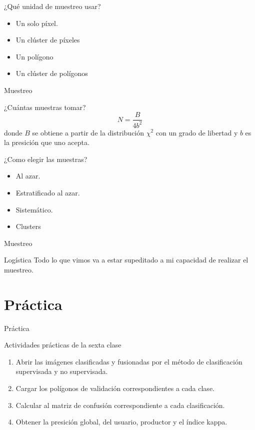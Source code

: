 \documentclass[]{beamer}
\begin{document}
\begin{frame}{\subsecname}
  \begin{block}{¿Qué unidad de muestreo usar?}
    \begin{itemize}[<+>]
      \item Un solo píxel.
      \item Un clúster de píxeles
      \item Un polígono
      \item Un clúster de polígonos
    \end{itemize}
  \end{block}
\end{frame}

\begin{frame}{Muestreo}
  \begin{block}{¿Cuántas muestras tomar?}
    $$N = \frac{B}{4b^2}$$ donde $B$ se obtiene a partir de la distribución $\chi^2$ con un grado de libertad y $b$ es la presición que uno acepta.
  \end{block}
\end{frame}

\begin{frame}{\subsecname}
  \begin{block}{¿Como elegir las muestras?}
    \begin{itemize}[<+>]
      \item Al azar.
      \item Estratificado al azar.
      \item Sistemático.
      \item Clusters
    \end{itemize}
  \end{block}
\end{frame}

\begin{frame}{Muestreo}
  \begin{alertblock}{Logística}
    Todo lo que vimos va a estar supeditado a mi capacidad de realizar el muestreo.
  \end{alertblock}
\end{frame}

\section{Práctica}

\begin{frame}{Práctica}
  \begin{exampleblock}{Actividades prácticas de la sexta clase}
    \begin{enumerate}
      \item Abrir las imágenes clasificadas y fusionadas por el método de clasificación supervisada y no supervisada.
      \item Cargar los polígonos de validación correspondientes a cada clase.
      \item Calcular al matriz de confusión correspondiente a cada clasificación.
      \item Obtener la presición global, del usuario, productor y el índice kappa.
    \end{enumerate}
  \end{exampleblock}
\end{frame}
\end{document}
